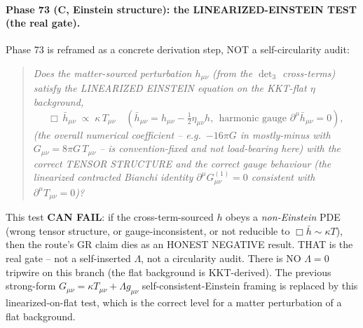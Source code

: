 \paragraph{Phase 73 (C, Einstein structure): the LINEARIZED-EINSTEIN TEST (the real
gate).} Phase 73 is reframed as a concrete derivation step, NOT a self-circularity audit:
\begin{quote}\itshape
Does the matter-sourced perturbation $h_{\mu\nu}$ (from the $\det_3$ cross-terms) satisfy
the LINEARIZED EINSTEIN equation on the KKT-flat $\eta$ background,
\[
  \Box\,\bar h_{\mu\nu} \;\propto\; \kappa\,T_{\mu\nu}
  \quad(\bar h_{\mu\nu}=h_{\mu\nu}-\tfrac12\eta_{\mu\nu}h,\ \ \text{harmonic gauge }
  \partial^\mu\bar h_{\mu\nu}=0),
\]
(the overall numerical coefficient -- e.g.\ $-16\pi G$ in mostly-minus with
$G_{\mu\nu}=8\pi G\,T_{\mu\nu}$ -- is convention-fixed and not load-bearing here) with the
correct TENSOR STRUCTURE and the correct gauge behaviour (the linearized contracted Bianchi
identity $\partial^\mu G^{(1)}_{\mu\nu}=0$ consistent with $\partial^\mu T_{\mu\nu}=0$)?
\end{quote}
This test \textbf{CAN FAIL}: if the cross-term-sourced $h$ obeys a \emph{non-Einstein} PDE
(wrong tensor structure, or gauge-inconsistent, or not reducible to
$\Box\bar h\sim\kappa T$), then the route's GR claim dies as an HONEST NEGATIVE result.
THAT is the real gate -- not a self-inserted $\Lambda$, not a circularity audit. There is
NO $\Lambda=0$ tripwire on this branch (the flat background is KKT-derived). The previous
strong-form $G_{\mu\nu}=\kappa T_{\mu\nu}+\Lambda g_{\mu\nu}$ self-consistent-Einstein
framing is replaced by this linearized-on-flat test, which is the correct level for a
matter perturbation of a flat background.

